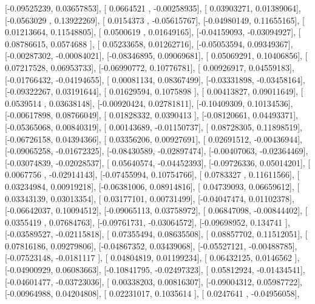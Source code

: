 \documentclass{article}
\begin{document}
       [-0.09525239,  0.03657853],
       [ 0.0664521 , -0.00258935],
       [ 0.03903271,  0.01389064],
       [-0.0563029 ,  0.13922269],
       [ 0.0154373 , -0.05615767],
       [-0.04980149,  0.11655165],
       [ 0.01213664,  0.11548805],
       [ 0.0500619 ,  0.01649165],
       [-0.04159093, -0.03094927],
       [ 0.08786615,  0.0574688 ],
       [ 0.05233658,  0.01262716],
       [-0.05053594,  0.09349367],
       [-0.00287302, -0.00084021],
       [-0.08346895,  0.09069681],
       [ 0.05069291,  0.10406856],
       [ 0.07217528,  0.06953733],
       [-0.06990772,  0.10776781],
       [ 0.00926917,  0.04559183],
       [-0.01766432, -0.04194655],
       [ 0.00081134,  0.08367499],
       [-0.03331898, -0.03458164],
       [-0.09322267,  0.03191644],
       [ 0.01629594,  0.1075898 ],
       [ 0.00413827,  0.09011649],
       [ 0.0539514 ,  0.03638148],
       [-0.00920424,  0.02781811],
       [-0.10409309,  0.10134536],
       [-0.00617898,  0.08766049],
       [ 0.01828332,  0.0390413 ],
       [-0.08120661,  0.04493371],
       [-0.05365068,  0.00840319],
       [ 0.00143689, -0.01150737],
       [ 0.08728305,  0.11898519],
       [-0.06726158,  0.04394366],
       [ 0.03356206,  0.00927691],
       [ 0.02691512, -0.00436944],
       [-0.09065258, -0.01672325],
       [-0.08430589, -0.02897474],
       [-0.00407063, -0.02364469],
       [-0.03074839, -0.02028537],
       [ 0.05640574, -0.04452393],
       [-0.09726336,  0.05014201],
       [ 0.0067756 , -0.02914143],
       [-0.07455994,  0.10754766],
       [ 0.0783327 ,  0.11611566],
       [ 0.03234984,  0.00919218],
       [-0.06381006,  0.08914816],
       [ 0.04739093,  0.06659612],
       [ 0.03343139,  0.03013354],
       [ 0.03177101,  0.00731499],
       [-0.04047474,  0.01102378],
       [-0.06642037,  0.10094512],
       [-0.09065113,  0.03758972],
       [ 0.06847098, -0.00844402],
       [ 0.0355419 ,  0.07684763],
       [-0.09761731, -0.03064572],
       [-0.09698952,  0.134741  ],
       [-0.03589527, -0.02115818],
       [ 0.07355494,  0.08635508],
       [ 0.08857702,  0.11512051],
       [ 0.07816186,  0.09279806],
       [-0.04867352,  0.03439068],
       [-0.05527121, -0.00488785],
       [-0.07523148, -0.0181117 ],
       [ 0.04804819,  0.01199234],
       [ 0.06432125,  0.0146562 ],
       [-0.04900929,  0.06083663],
       [-0.10841795, -0.02497323],
       [ 0.05812924, -0.01434541],
       [-0.04601477, -0.03723036],
       [ 0.00338203,  0.00816307],
       [-0.09004312,  0.05987722],
       [-0.00964988,  0.04204808],
       [ 0.02231017,  0.1035614 ],
       [ 0.0247641 , -0.04956058],
\end{document}
